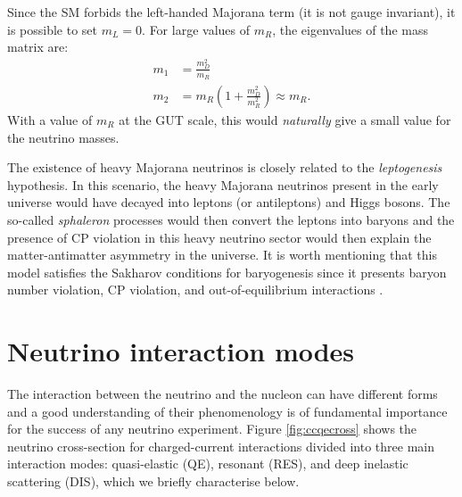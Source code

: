 Since the SM forbids the left-handed Majorana term (it is not gauge invariant), it is possible to set $m_L=0$. For large values of $m_R$, the eigenvalues of the mass matrix are:
\begin{align}
    m_1 & = \frac{m_D^2}{m_R} \\
    m_2 & = m_R \left(1+\frac{m_D^2}{m_R^2}\right) \approx m_R.
\end{align}
With a value of $m_R$ at the GUT scale, this would \emph{naturally} give a small value for the neutrino masses. 

The existence of heavy Majorana neutrinos is closely related to the \emph{leptogenesis} hypothesis. In this scenario, the heavy Majorana neutrinos present in the early universe would have decayed into leptons (or antileptons) and Higgs bosons. The so-called \emph{sphaleron} processes would then convert the leptons into baryons and the presence of CP violation in this heavy neutrino sector would then explain the matter-antimatter asymmetry in the universe. It is worth mentioning that this model satisfies the Sakharov conditions \cite{Sakharov:1967dj} for baryogenesis since it presents baryon number violation, CP violation, and out-of-equilibrium interactions \cite{DiBari:2012fz}.


\section{Neutrino interaction modes}\label{sec:modes}
The interaction between the neutrino and the nucleon can have different forms and a good understanding of their phenomenology is of fundamental importance for the success of any neutrino experiment.
Figure \ref{fig:ccqecross} shows the neutrino cross-section for charged-current interactions divided into three main interaction modes: quasi-elastic (QE), resonant (RES), and deep inelastic scattering (DIS), which we briefly characterise below. 

